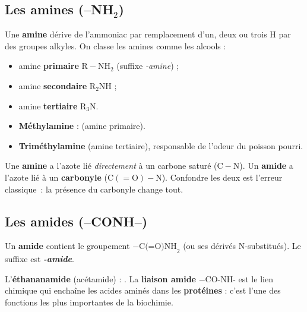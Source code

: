 \documentclass[11pt,a4paper]{article}
\begin{document}
\subsection{Les amines (--NH$_2$)}
\begin{definition}[Amine]
Une \textbf{amine} dérive de l'ammoniac  par remplacement d'un, deux ou trois H par des groupes alkyles. On classe les amines comme les alcools :
\begin{itemize}[leftmargin=1.6em,itemsep=1pt]
  \item amine \textbf{primaire} $\mathrm{R-NH_2}$ (suffixe \textit{-amine}) ;
  \item amine \textbf{secondaire} $\mathrm{R_2NH}$ ;
  \item amine \textbf{tertiaire} $\mathrm{R_3N}$.
\end{itemize}
\end{definition}

\begin{exemple}[Amines]
\begin{itemize}[leftmargin=1.6em,itemsep=2pt]
  \item \textbf{Méthylamine}  :  (amine primaire).
  \item \textbf{Triméthylamine}  (amine tertiaire), responsable de l'odeur du poisson pourri.
\end{itemize}
\end{exemple}

\begin{attention}
Une \textbf{amine} a l'azote lié \emph{directement} à un carbone saturé ($\mathrm{C-N}$). Un \textbf{amide} a l'azote lié à un \textbf{carbonyle} ($\mathrm{C(=O)-N}$). Confondre les deux est l'erreur classique~: la présence du carbonyle change tout.
\end{attention}

\subsection{Les amides (--CONH--)}
\begin{definition}[Amide]
Un \textbf{amide} contient le groupement $-\text{C(=O)NH}_2$ (ou ses dérivés N-substitués). Le suffixe est \textbf{\textit{-amide}}.
\end{definition}

\begin{exemple}[Amide]
L'\textbf{éthananamide} (acétamide)  : . La \textbf{liaison amide} $-\text{CO-NH-}$ est le lien chimique qui enchaîne les acides aminés dans les \textbf{protéines} : c'est l'une des fonctions les plus importantes de la biochimie.
\end{exemple}
\end{document}
